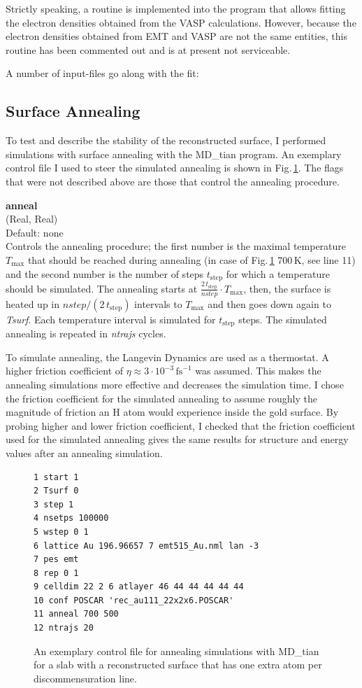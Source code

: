 \documentclass[twoside, 11pt, titlepage, captions=nooneline, a4paper, headsepline]{scrbook}%
\newcommand{\9}{\mathrm}
\newcommand{\0}{\,\mathrm}
\begin{document}
Strictly speaking, a routine is implemented into the program that allows fitting the electron densities obtained from the VASP calculations. However, because the electron densities obtained from EMT and VASP are not the same entities, this routine has been commented out and is at present not serviceable.

A number of input-files go along with the fit:

\subsection{Surface Annealing}
To test and describe the stability of the reconstructed surface, I performed simulations with surface annealing with the MD\_tian program. An exemplary control file I used to steer the simulated annealing is shown in Fig.\,\ref{Fig:mxt:anneal}. The flags that were not described above are those that control the annealing procedure.

\textbf{anneal}\\
(Real, Real)\\
Default: none\\
Controls the annealing procedure; the first number is the maximal temperature $T_\mathrm{max}$ that should be reached during annealing (in case of Fig.\,\ref{Fig:mxt:anneal} 700\,K, see line 11) and the second number is the number of steps $t_\mathrm{step}$ for which a temperature should be simulated.
The annealing starts at $\tfrac{2\,t_\mathrm{step}}{nstep} \cdot T_\mathrm{max}$, then, the surface is heated up in $nstep/(2\,t_\mathrm{step})$ intervals to $T_\mathrm{max}$ and then goes down again to \textit{Tsurf}. Each temperature interval is simulated for $t_\mathrm{step}$ steps. The simulated annealing is repeated in \textit{ntrajs} cycles.

To simulate annealing, the Langevin Dynamics are used as a thermostat. A higher friction coefficient of $\eta \approx 3\cdot10^{-3}$\,$\mathrm{fs}^{-1}$ was assumed. This makes the annealing simulations more effective and decreases the simulation time. I chose the friction coefficient for the simulated annealing to assume roughly the magnitude of friction an H atom would experience inside the gold surface. By probing higher and lower friction coefficient, I checked that the friction coefficient used for the simulated annealing gives the same results for structure and energy values after an annealing simulation.

\begin{figure}[b!]
\begin{verbatim}
1 start 1
2 Tsurf 0
3 step 1
4 nsetps 100000
5 wstep 0 1
6 lattice Au 196.96657 7 emt515_Au.nml lan -3
7 pes emt
8 rep 0 1
9 celldim 22 2 6 atlayer 46 44 44 44 44 44
10 conf POSCAR 'rec_au111_22x2x6.POSCAR'
11 anneal 700 500
12 ntrajs 20
\end{verbatim}
\caption{\label{Fig:mxt:anneal}An exemplary control file for annealing simulations with MD\_tian for a slab with a reconstructed surface that has one extra atom per discommensuration line.}
\end{figure}
\end{document}
